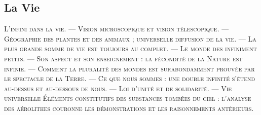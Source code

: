 \documentclass[a4paper, 11pt, oneside]{article}
\begin{document}
\subsection{La Vie}
\begin{center}
\scshape
\small
L'infini dans la vie. --- Vision microscopique et vision télescopique. --- Géographie des plantes et des animaux ; universelle diffusion de la vie. --- La plus grande somme de vie est toujours au complet. --- Le monde des infiniment petits. --- Son aspect et son enseignement : la fécondité de la Nature est infinie. --- Comment la pluralité des mondes est surabondamment prouvée par le spectacle de la Terre. --- Ce que nous sommes : une double infinité s'étend au-dessus et au-dessous de nous. --- Loi d'unité et de solidarité. --- Vie universelle Éléments constitutifs des substances tombées du ciel : l'analyse des aérolithes couronne les démonstrations et les raisonnements antérieurs.
\end{center}
\end{document}

